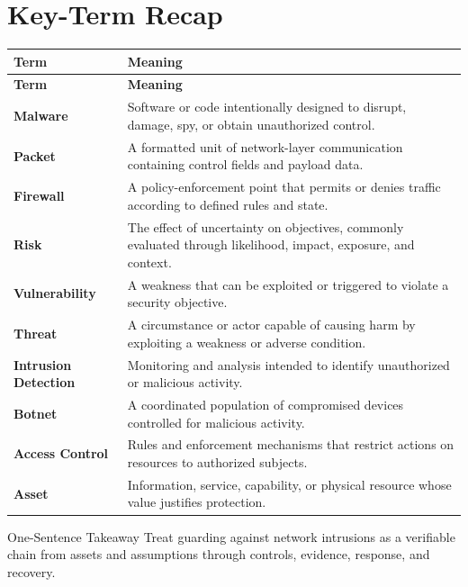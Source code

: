 \documentclass[11pt,letterpaper]{article}
\begin{document}
\section*{Key-Term Recap}
\begin{longtable}{>{\raggedright\arraybackslash}p{}>{\raggedright\arraybackslash}p{}}
\toprule\rowcolor{Navy}\color{white}\textbf{Term} & \color{white}\textbf{Meaning}\\\midrule
\endfirsthead
\toprule\rowcolor{Navy}\color{white}\textbf{Term} & \color{white}\textbf{Meaning}\\\midrule
\endhead
\textbf{Malware} & Software or code intentionally designed to disrupt, damage, spy, or obtain unauthorized control. \\\midrule
\textbf{Packet} & A formatted unit of network-layer communication containing control fields and payload data. \\\midrule
\textbf{Firewall} & A policy-enforcement point that permits or denies traffic according to defined rules and state. \\\midrule
\textbf{Risk} & The effect of uncertainty on objectives, commonly evaluated through likelihood, impact, exposure, and context. \\\midrule
\textbf{Vulnerability} & A weakness that can be exploited or triggered to violate a security objective. \\\midrule
\textbf{Threat} & A circumstance or actor capable of causing harm by exploiting a weakness or adverse condition. \\\midrule
\textbf{Intrusion Detection} & Monitoring and analysis intended to identify unauthorized or malicious activity. \\\midrule
\textbf{Botnet} & A coordinated population of compromised devices controlled for malicious activity. \\\midrule
\textbf{Access Control} & Rules and enforcement mechanisms that restrict actions on resources to authorized subjects. \\\midrule
\textbf{Asset} & Information, service, capability, or physical resource whose value justifies protection. \\\midrule
\bottomrule
\end{longtable}
\begin{CornellExamBox}{One-Sentence Takeaway}
Treat guarding against network intrusions as a verifiable chain from assets and assumptions through controls, evidence, response, and recovery.
\end{CornellExamBox}
\end{document}
